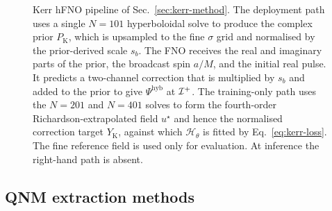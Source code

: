 \begin{figure}[!htbp]
{}
\caption{Kerr hFNO pipeline of Sec.~\ref{sec:kerr-method}.
The deployment path uses a single $N = 101$ hyperboloidal solve to
produce the complex prior $P_{\mathrm K}$, which is upsampled to
the fine $\sigma$ grid and normalised by the prior-derived scale
$s_b$. The FNO receives the real and imaginary parts of the prior, the
broadcast spin $a/M$, and the initial real pulse. It predicts a
two-channel correction that is multiplied by $s_b$ and added to the
prior to give $\Psi^{\mathrm{hyb}}$ at $\mathcal{I}^{+}$. The training-only path
uses the $N = 201$ and $N = 401$ solves to form the fourth-order
Richardson-extrapolated field $u^\star$ and hence the normalised
correction target $Y_{\mathrm K}$, against which
$\mathcal{H}_{\theta}$ is fitted by
Eq.~\eqref{eq:kerr-loss}. The fine reference field is used only for evaluation.
At inference the right-hand path is absent.}
\label{fig:kerr-arch}
\end{figure}

\subsection{QNM extraction methods}
\label{sec:qnm-methods}

